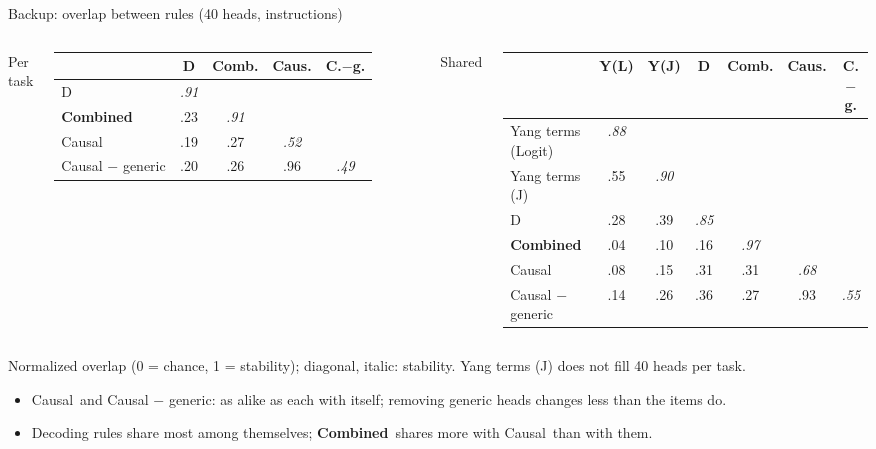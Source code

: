 \documentclass[aspectratio=169,11pt,xcolor=table]{beamer}
\newcommand{\gnote}[1]{{\footnotesize\color{gray}#1}}
\newcommand{\Sel}{\textcolor{cSel}{\textbf{Combined}}}
\newcommand{\Causal}{\textcolor{cCaus}{Causal}}
\newcommand{\CausalG}{\textcolor{cCausG}{Causal $-$ generic}}
\begin{document}
\begin{frame}{Backup: overlap between rules (40 heads, instructions)}
\begin{columns}[t]
\centering\footnotesize\setlength{\tabcolsep}{4pt}
Per task\\[3pt]
\begin{tabular}{@{}lcccc@{}}
\toprule
 & D & Comb. & Caus. & C.$-$g. \\
\midrule
D & \textit{.91} & & & \\
\Sel & .23 & \textit{.91} & & \\
\Causal & .19 & .27 & \textit{.52} & \\
\CausalG & .20 & .26 & .96 & \textit{.49} \\
\bottomrule
\end{tabular}
\centering\footnotesize\setlength{\tabcolsep}{4pt}
Shared\\[3pt]
\begin{tabular}{@{}lcccccc@{}}
\toprule
 & Y(L) & Y(J) & D & Comb. & Caus. & C.$-$g. \\
\midrule
Yang terms (Logit) & \textit{.88} & & & & & \\
Yang terms (J) & .55 & \textit{.90} & & & & \\
D & .28 & .39 & \textit{.85} & & & \\
\Sel & .04 & .10 & .16 & \textit{.97} & & \\
\Causal & .08 & .15 & .31 & .31 & \textit{.68} & \\
\CausalG & .14 & .26 & .36 & .27 & .93 & \textit{.55} \\
\bottomrule
\end{tabular}
\end{columns}

\vspace{0.6em}
\gnote{Normalized overlap (0 = chance, 1 = stability); diagonal, italic: stability. Yang terms (J) does not fill 40 heads per task.}
\raggedright
\begin{itemize}
\item \Causal\ and \CausalG: as alike as each with itself; removing generic heads changes less than the items do.
\item Decoding rules share most among themselves; \Sel\ shares more with \Causal\ than with them.
\end{itemize}
\end{frame}
\end{document}
